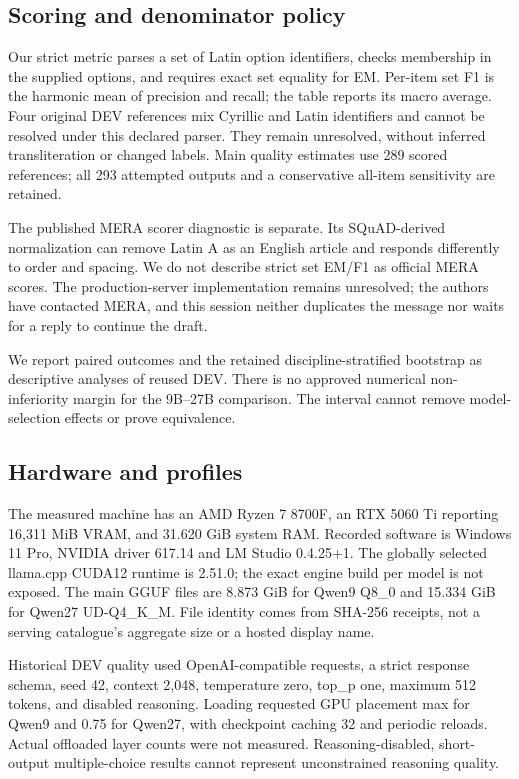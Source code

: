 \documentclass[10pt,a4paper]{article}
\begin{document}
\subsection*{Scoring and denominator policy}

Our strict metric parses a set of Latin option identifiers, checks membership in the supplied options, and requires exact set equality for EM. Per-item set F1 is the harmonic mean of precision and recall; the table reports its macro average. Four original DEV references mix Cyrillic and Latin identifiers and cannot be resolved under this declared parser. They remain unresolved, without inferred transliteration or changed labels. Main quality estimates use 289 scored references; all 293 attempted outputs and a conservative all-item sensitivity are retained.


The published MERA scorer diagnostic is separate. Its SQuAD-derived normalization can remove Latin A as an English article and responds differently to order and spacing. We do not describe strict set EM/F1 as official MERA scores. The production-server implementation remains unresolved; the authors have contacted MERA, and this session neither duplicates the message nor waits for a reply to continue the draft.


We report paired outcomes and the retained discipline-stratified bootstrap as descriptive analyses of reused DEV. There is no approved numerical non-inferiority margin for the 9B--27B comparison. The interval cannot remove model-selection effects or prove equivalence.


\subsection*{Hardware and profiles}

The measured machine has an AMD Ryzen 7 8700F, an RTX 5060 Ti reporting 16,311 MiB VRAM, and 31.620 GiB system RAM. Recorded software is Windows 11 Pro, NVIDIA driver 617.14 and LM Studio 0.4.25+1. The globally selected llama.cpp CUDA12 runtime is 2.51.0; the exact engine build per model is not exposed. The main GGUF files are 8.873 GiB for Qwen9 Q8\_0 and 15.334 GiB for Qwen27 UD-Q4\_K\_M. File identity comes from SHA-256 receipts, not a serving catalogue's aggregate size or a hosted display name.


Historical DEV quality used OpenAI-compatible requests, a strict response schema, seed 42, context 2,048, temperature zero, top\_p one, maximum 512 tokens, and disabled reasoning. Loading requested GPU placement max for Qwen9 and 0.75 for Qwen27, with checkpoint caching 32 and periodic reloads. Actual offloaded layer counts were not measured. Reasoning-disabled, short-output multiple-choice results cannot represent unconstrained reasoning quality.
\end{document}
